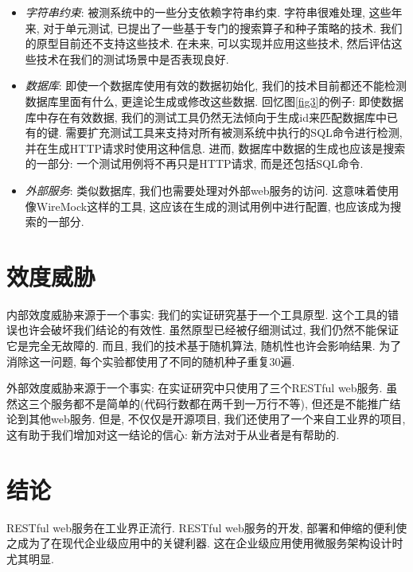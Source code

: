         \begin{itemize}
          \item \textit{字符串约束}: 被测系统中的一些分支依赖字符串约束. 字符串很难处理, 这些年来, 对于单元测试, 已提出了一些基于专门的搜索算子和种子策略的技术. 我们的原型目前还不支持这些技术. 在未来, 可以实现并应用这些技术, 然后评估这些技术在我们的测试场景中是否表现良好. 
            
            \item \textit{数据库}: 即使一个数据库使用有效的数据初始化, 我们的技术目前都还不能检测数据库里面有什么, 更遑论生成或修改这些数据. 回忆图\ref{fig3}的例子: 即使数据库中存在有效数据, 我们的测试工具仍然无法倾向于生成id来匹配数据库中已有的键. 需要扩充测试工具来支持对所有被测系统中执行的SQL命令进行检测, 并在生成HTTP请求时使用这种信息. 进而, 数据库中数据的生成也应该是搜索的一部分: 一个测试用例将不再只是HTTP请求, 而是还包括SQL命令. 
            
            \item \textit{外部服务}: 类似数据库, 我们也需要处理对外部web服务的访问. 这意味着使用像WireMock这样的工具, 这应该在生成的测试用例中进行配置, 也应该成为搜索的一部分. 
        \end{itemize}
        

\section{效度威胁}
  内部效度威胁来源于一个事实: 我们的实证研究基于一个工具原型. 这个工具的错误也许会破坏我们结论的有效性. 虽然原型已经被仔细测试过, 我们仍然不能保证它是完全无故障的. 而且, 我们的技术基于随机算法, 随机性也许会影响结果. 为了消除这一问题, 每个实验都使用了不同的随机种子重复30遍. 
    
    外部效度威胁来源于一个事实: 在实证研究中只使用了三个RESTful web服务. 虽然这三个服务都不是简单的(代码行数都在两千到一万行不等), 但还是不能推广结论到其他web服务. 但是, 不仅仅是开源项目, 我们还使用了一个来自工业界的项目, 这有助于我们增加对这一结论的信心: 新方法对于从业者是有帮助的. 

\section{结论}
  RESTful web服务在工业界正流行. RESTful web服务的开发, 部署和伸缩的便利使之成为了在现代企业级应用中的关键利器. 这在企业级应用使用微服务架构设计时尤其明显. 
    
